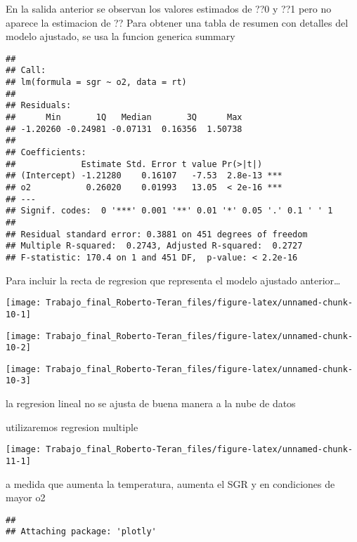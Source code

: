 \documentclass[
]{article}
\begin{document}
En la salida anterior se observan los valores estimados de ??0 y ??1
pero no aparece la estimacion de ?? Para obtener una tabla de resumen
con detalles del modelo ajustado, se usa la funcion generica summary

\begin{verbatim}
## 
## Call:
## lm(formula = sgr ~ o2, data = rt)
## 
## Residuals:
##      Min       1Q   Median       3Q      Max 
## -1.20260 -0.24981 -0.07131  0.16356  1.50738 
## 
## Coefficients:
##             Estimate Std. Error t value Pr(>|t|)    
## (Intercept) -1.21280    0.16107   -7.53  2.8e-13 ***
## o2           0.26020    0.01993   13.05  < 2e-16 ***
## ---
## Signif. codes:  0 '***' 0.001 '**' 0.01 '*' 0.05 '.' 0.1 ' ' 1
## 
## Residual standard error: 0.3881 on 451 degrees of freedom
## Multiple R-squared:  0.2743, Adjusted R-squared:  0.2727 
## F-statistic: 170.4 on 1 and 451 DF,  p-value: < 2.2e-16
\end{verbatim}

Para incluir la recta de regresion que representa el modelo ajustado
anterior\ldots{}

\begin{center}\texttt{[image: Trabajo\_final\_Roberto-Teran\_files/figure-latex/unnamed-chunk-10-1]} \end{center}

\begin{center}\texttt{[image: Trabajo\_final\_Roberto-Teran\_files/figure-latex/unnamed-chunk-10-2]} \end{center}

\begin{center}\texttt{[image: Trabajo\_final\_Roberto-Teran\_files/figure-latex/unnamed-chunk-10-3]} \end{center}

la regresion lineal no se ajusta de buena manera a la nube de datos

utilizaremos regresion multiple

\begin{center}\texttt{[image: Trabajo\_final\_Roberto-Teran\_files/figure-latex/unnamed-chunk-11-1]} \end{center}

a medida que aumenta la temperatura, aumenta el SGR y en condiciones de
mayor o2

\begin{verbatim}
## 
## Attaching package: 'plotly'
\end{verbatim}
\end{document}
